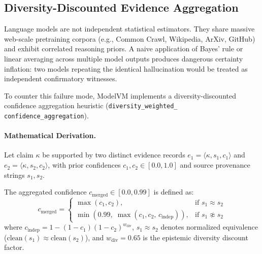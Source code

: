 \subsection{Diversity-Discounted Evidence Aggregation}
\label{sec:evidence_aggregation}

Language models are not independent statistical estimators. They share massive web-scale pretraining corpora (e.g., Common Crawl, Wikipedia, ArXiv, GitHub) and exhibit correlated reasoning priors. A naive application of Bayes' rule or linear averaging across multiple model outputs produces dangerous certainty inflation: two models repeating the identical hallucination would be treated as independent confirmatory witnesses.

To counter this failure mode, ModelVM implements a diversity-discounted confidence aggregation heuristic (\texttt{diversity\_weighted\_} \texttt{confidence\_aggregation}). 

\paragraph{Mathematical Derivation.}
Let claim $\kappa$ be supported by two distinct evidence records $e_1 = \langle \kappa, s_1, c_1 \rangle$ and $e_2 = \langle \kappa, s_2, c_2 \rangle$, with prior confidences $c_1, c_2 \in [0.0, 1.0]$ and source provenance strings $s_1, s_2$.

The aggregated confidence $c_{\text{merged}} \in [0.0, 0.99]$ is defined as:
\begin{equation}
c_{\text{merged}} = \begin{cases}
\max(c_1, c_2), & \text{if } s_1 \approx s_2 \\[3pt]
\min\left(0.99, \;\max(c_1, c_2, \, c_{\text{indep}})\right), & \text{if } s_1 \not\approx s_2
\end{cases}
\label{eq:diversity_formula}
\end{equation}
where $c_{\text{indep}} = 1 - (1 - c_1)(1 - c_2)^{w_{\text{div}}}$, $s_1 \approx s_2$ denotes normalized equivalence ($\text{clean}(s_1) \approx \text{clean}(s_2)$), and $w_{\text{div}} = 0.65$ is the epistemic diversity discount factor.

